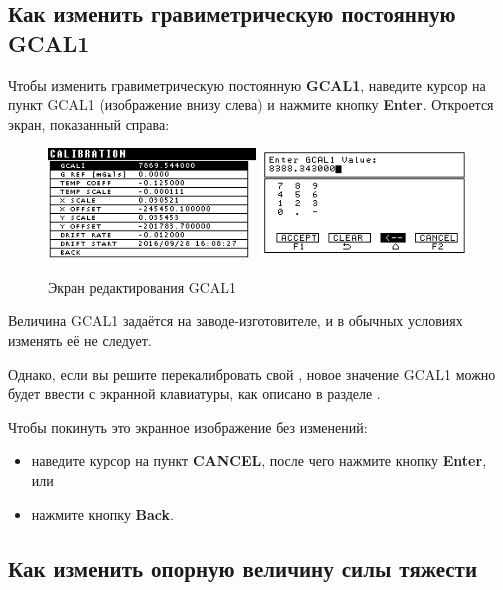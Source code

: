 \subsection{Как изменить гравиметрическую постоянную GCAL1}

Чтобы изменить гравиметрическую постоянную \textbf{GCAL1}, наведите курсор на
пункт GCAL1 (изображение внизу слева) и нажмите кнопку \textbf{Enter}. Откроется
экран, показанный справа:

\begin{figure}[H]
  \centering
  \includegraphics[width=0.49\textwidth]{figures/the_gcal1_editing_screen_1}
  \includegraphics[width=0.49\textwidth]{figures/the_gcal1_editing_screen_2}
  \caption{Экран редактирования GCAL1}
  \label{fig:the_gcal1_editing_screen}
\end{figure}

Величина GCAL1 задаётся на заводе-изготовителе, и в обычных условиях изменять её
не следует.

Однако, если вы решите перекалибровать свой \cg{}, новое значение GCAL1 можно
будет ввести с экранной клавиатуры, как описано в разделе
.

Чтобы покинуть это экранное изображение без изменений:
\begin{itemize}
  \item наведите курсор на пункт \textbf{CANCEL}, после чего нажмите кнопку
    \textbf{Enter}, или

  \item нажмите кнопку \textbf{Back}.
\end{itemize}

\subsection{Как изменить опорную величину силы тяжести}

